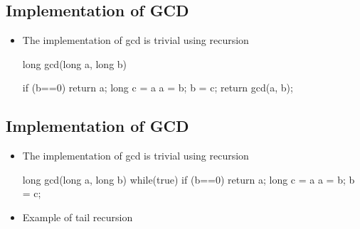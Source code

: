 
\begin{slide}
\section{Implementation of GCD}

\begin{itemize}
  \item The implementation of gcd is trivial using recursion
    \begin{java}
      long gcd(long a, long b)
      {

           if (b==0) {
              return a;
           }
           long c = a%
           a = b;
           b = c;
           return gcd(a, b);
      }
    \end{java}
\end{itemize}

\end{slide}


\begin{slide}
\section{Implementation of GCD}

\begin{itemize}
  \item The implementation of gcd is trivial using recursion
    \begin{java}
      long gcd(long a, long b)
      {
        while(true) {
           if (b==0) {
              return a;
           }
           long c = a%
           a = b;
           b = c;
         }
      }
    \end{java}
  \item Example of tail recursion
\end{itemize}

\end{slide}




